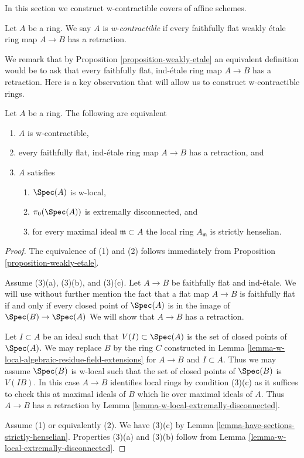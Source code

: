 \noindent
In this section we construct w-contractible covers of affine schemes.

\begin{definition}
\label{definition-w-contractible}
Let $A$ be a ring. We say $A$ is {\it w-contractible} if every
faithfully flat weakly \'etale ring map $A \to B$ has a retraction.
\end{definition}

\noindent
We remark that by Proposition \ref{proposition-weakly-etale}
an equivalent definition would be to ask that every faithfully
flat, ind-\'etale ring map $A \to B$ has a retraction.
Here is a key observation that will allow us to construct
w-contractible rings.

\begin{lemma}
\label{lemma-w-local-strictly-henselian-extremally-disconnected}
Let $A$ be a ring. The following are equivalent
\begin{enumerate}
\item $A$ is w-contractible,
\item every faithfully flat, ind-\'etale ring map $A \to B$ has
a retraction, and
\item $A$ satisfies
\begin{enumerate}
\item $\Spec(A)$ is w-local,
\item $\pi_0(\Spec(A))$ is extremally disconnected, and
\item for every maximal ideal $\mathfrak m \subset A$ the
local ring $A_\mathfrak m$ is strictly henselian.
\end{enumerate}
\end{enumerate}
\end{lemma}

\begin{proof}
The equivalence of (1) and (2) follows immediately from
Proposition \ref{proposition-weakly-etale}.

\medskip\noindent
Assume (3)(a), (3)(b), and (3)(c). Let $A \to B$ be faithfully flat
and ind-\'etale. We will use without further mention the fact that a flat map
$A \to B$ is faithfully flat if and only if every closed point
of $\Spec(A)$ is in the image of $\Spec(B) \to \Spec(A)$
We will show that $A \to B$ has a retraction.

\medskip\noindent
Let $I \subset A$ be an ideal such that $V(I) \subset \Spec(A)$ is
the set of closed points of $\Spec(A)$. 
We may replace $B$ by the ring $C$ constructed in
Lemma \ref{lemma-w-local-algebraic-residue-field-extensions}
for $A \to B$ and $I \subset A$.
Thus we may assume $\Spec(B)$ is w-local such that the set of
closed points of $\Spec(B)$ is $V(IB)$. In this case $A \to B$
identifies local rings by condition (3)(c) as it suffices to check
this at maximal ideals of $B$ which lie over maximal ideals of $A$.
Thus $A \to B$ has a retraction by
Lemma \ref{lemma-w-local-extremally-disconnected}.

\medskip\noindent
Assume (1) or equivalently (2). We have (3)(c) by
Lemma \ref{lemma-have-sections-strictly-henselian}.
Properties (3)(a) and (3)(b) follow from
Lemma \ref{lemma-w-local-extremally-disconnected}.
\end{proof}


